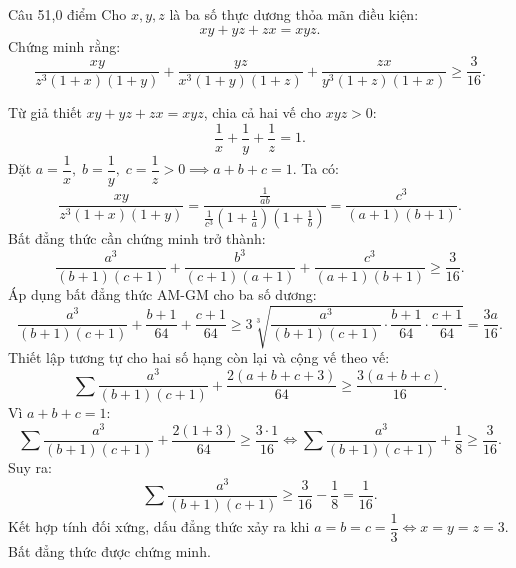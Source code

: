 \begin{de_cau}{Câu 5}{1,0 điểm}
Cho $x, y, z$ là ba số thực dương thỏa mãn điều kiện:
\[xy + yz + zx = xyz.\]
Chứng minh rằng:
\[\dfrac{xy}{z^3(1+x)(1+y)} + \dfrac{yz}{x^3(1+y)(1+z)} + \dfrac{zx}{y^3(1+z)(1+x)} \ge \dfrac{3}{16}.\]
\end{de_cau}

\begin{loi_giai_cau}
Từ giả thiết $xy + yz + zx = xyz$, chia cả hai vế cho $xyz > 0$:
\[\frac{1}{x} + \frac{1}{y} + \frac{1}{z} = 1.\]
Đặt $a = \dfrac{1}{x},\; b = \dfrac{1}{y},\; c = \dfrac{1}{z} > 0 \implies a + b + c = 1$.
Ta có:
\[\frac{xy}{z^3(1+x)(1+y)} = \frac{\frac{1}{ab}}{\frac{1}{c^3}\left(1+\frac{1}{a}\right)\left(1+\frac{1}{b}\right)} = \frac{c^3}{(a+1)(b+1)}.\]
Bất đẳng thức cần chứng minh trở thành:
\[\frac{a^3}{(b+1)(c+1)} + \frac{b^3}{(c+1)(a+1)} + \frac{c^3}{(a+1)(b+1)} \ge \frac{3}{16}.\]
Áp dụng bất đẳng thức AM-GM cho ba số dương:
\[\frac{a^3}{(b+1)(c+1)} + \frac{b+1}{64} + \frac{c+1}{64} \ge 3 \sqrt[3]{\frac{a^3}{(b+1)(c+1)} \cdot \frac{b+1}{64} \cdot \frac{c+1}{64}} = \frac{3a}{16}.\]
Thiết lập tương tự cho hai số hạng còn lại và cộng vế theo vế:
\[\sum \frac{a^3}{(b+1)(c+1)} + \frac{2(a+b+c+3)}{64} \ge \frac{3(a+b+c)}{16}.\]
Vì $a+b+c=1$:
\[\sum \frac{a^3}{(b+1)(c+1)} + \frac{2(1+3)}{64} \ge \frac{3 \cdot 1}{16} \iff \sum \frac{a^3}{(b+1)(c+1)} + \frac{1}{8} \ge \frac{3}{16}.\]
Suy ra:
\[\sum \frac{a^3}{(b+1)(c+1)} \ge \frac{3}{16} - \frac{1}{8} = \frac{1}{16}.\]
Kết hợp tính đối xứng, dấu đẳng thức xảy ra khi $a = b = c = \dfrac{1}{3} \iff x = y = z = 3$.
Bất đẳng thức được chứng minh.
\end{loi_giai_cau}
